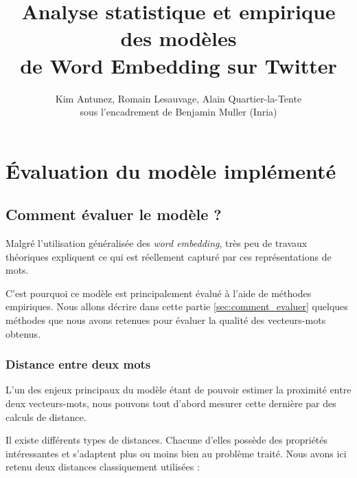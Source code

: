 \documentclass[11pt,french,french]{article}
\title{Analyse statistique et empirique des modèles\\
de Word Embedding sur Twitter}
\author{Kim Antunez, Romain Lesauvage, Alain Quartier-la-Tente\\
sous l'encadrement de Benjamin Muller (Inria)}
\date{}
\begin{document}
\maketitle


\hypertarget{uxe9valuation-du-moduxe8le-impluxe9mentuxe9}{%
\section{Évaluation du modèle
implémenté}\label{uxe9valuation-du-moduxe8le-impluxe9mentuxe9}}

\hypertarget{comment-uxe9valuer-le-moduxe8le}{%
\subsection{Comment évaluer le modèle
?}\label{comment-uxe9valuer-le-moduxe8le}}

\label{sec:comment_evaluer}

Malgré l'utilisation généralisée des \emph{word embedding}, très peu de
travaux théoriques expliquent ce qui est réellement capturé par ces
représentations de mots.

C'est pourquoi ce modèle est principalement évalué à l'aide de méthodes
empiriques. Nous allons décrire dans cette partie
\ref{sec:comment_evaluer} quelques méthodes que nous avons retenues pour
évaluer la qualité des vecteurs-mots obtenus.

\hypertarget{distance-entre-deux-mots}{%
\subsubsection{Distance entre deux
mots}\label{distance-entre-deux-mots}}

L'un des enjeux principaux du modèle étant de pouvoir estimer la
proximité entre deux vecteurs-mots, nous pouvons tout d'abord mesurer
cette dernière par des calculs de distance.

Il existe différents types de distances. Chacune d'elles possède des
propriétés intéressantes et s'adaptent plus ou moins bien au problème
traité. Nous avons ici retenu deux distances classiquement utilisées :
\end{document}
